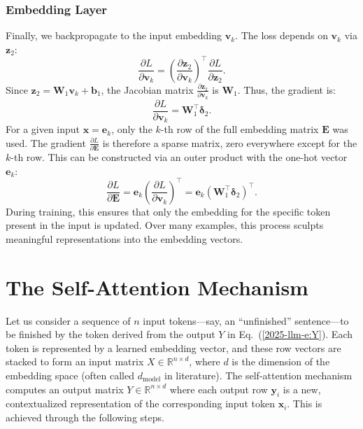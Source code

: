 \documentclass[%
  reprint,
  superscriptaddress,
  showpacs,
  showkeys,
  amsmath,amssymb,
  pra,
  longbibliography,
  floatfix,
  x11names
]{revtex4-2}
\begin{document}
\subsubsection{Embedding Layer}
Finally, we backpropagate to the input embedding $\bm{v}_k$. The loss depends on $\bm{v}_k$ via $\bm{z}_2$:
\begin{equation}
\frac{\partial L}{\partial \bm{v}_k} = \left(\frac{\partial \bm{z}_2}{\partial \bm{v}_k}\right)^\intercal \frac{\partial L}{\partial \bm{z}_2}.
\end{equation}
Since $\bm{z}_2 = \bm{W}_1 \bm{v}_k + \bm{b}_1$, the Jacobian matrix $\frac{\partial \bm{z}_2}{\partial \bm{v}_k}$ is $\bm{W}_1$. Thus, the gradient is:
\begin{equation}
\frac{\partial L}{\partial \bm{v}_k} = \bm{W}_1^\intercal \bm{\delta}_2.
\end{equation}
For a given input $\bm{x}=\bm{e}_k$, only the $k$-th row of the full embedding matrix $\bm{E}$ was used. The gradient $\frac{\partial L}{\partial \bm{E}}$ is therefore a sparse matrix, zero everywhere except for the $k$-th row. This can be constructed via an outer product with the one-hot vector $\bm{e}_k$:
\begin{equation}
\frac{\partial L}{\partial \bm{E}} = \bm{e}_k \left(\frac{\partial L}{\partial \bm{v}_k}\right)^\intercal = \bm{e}_k \left(\bm{W}_1^\intercal \bm{\delta}_2\right)^\intercal.
\end{equation}
During training, this ensures that only the embedding for the specific token present in the input is updated. Over many examples, this process sculpts meaningful representations into the embedding vectors.




\section{The Self-Attention Mechanism}

Let us consider a sequence of $n$ input tokens---say, an ``unfinished'' sentence---to be finished by the token derived from the output $Y$ in Eq.~(\ref{2025-llm-e:Y}).
Each token is represented by a learned embedding vector,
and these row vectors are stacked to form an input matrix
$X \in \mathbb{R}^{n \times d}$,
where $d$ is the dimension of the embedding space (often called $d_{\text{model}}$ in literature). The self-attention mechanism computes an output matrix $Y \in \mathbb{R}^{n \times d}$ where each output row $\bm{y}_i$ is a new, contextualized representation of the corresponding input token $\bm{x}_i$. This is achieved through the following steps.
\end{document}
